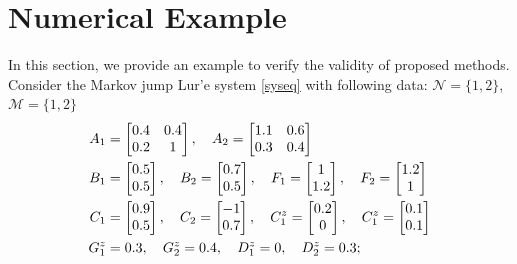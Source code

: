 \documentclass[conference]{IEEEtran}
\begin{document}
\section{Numerical Example}

In this section, we provide an example to verify the validity of proposed methods. Consider the Markov jump Lur'e system \eqref{syseq} with following data: $\mathcal{N}=\{1,2\}$, $\mathcal{M}=\{1,2\}$ 
\begin{equation} \notag
	\begin{aligned}
		A_{1}&=\begin{bmatrix}
			0.4&0.4\\
			0.2&1
		\end{bmatrix}, \quad
		A_{2}=\begin{bmatrix}
			1.1&0.6\\
			0.3&0.4
		\end{bmatrix}\\     
		B_{1}&=\begin{bmatrix}
		0.5\\0.5
		\end{bmatrix}, \quad
		B_2 = \begin{bmatrix}
		0.7\\0.5
		\end{bmatrix}, \quad
		F_{1}=\begin{bmatrix}
		1\\1.2
		\end{bmatrix},\quad
		F_{2}=\begin{bmatrix}
		1.2\\1
		\end{bmatrix}
		\\
		C_{1}&=\begin{bmatrix}
		0.9\\0.5
		\end{bmatrix},\quad
		C_{2}=\begin{bmatrix}
		-1\\0.7
		\end{bmatrix},\quad
		C^{z}_{1}=\begin{bmatrix}
		0.2\\0
		\end{bmatrix},\quad
		C^{z}_{1}=\begin{bmatrix}
		0.1\\0.1
		\end{bmatrix} \\       
		G^{z}_{1}& = 0.3,\quad G^{z}_{2} = 0.4,\quad D^{z}_{1} = 0,\quad D^{z}_{2} = 0.3;\\

\end{aligned}
\end{equation}
\end{document}
